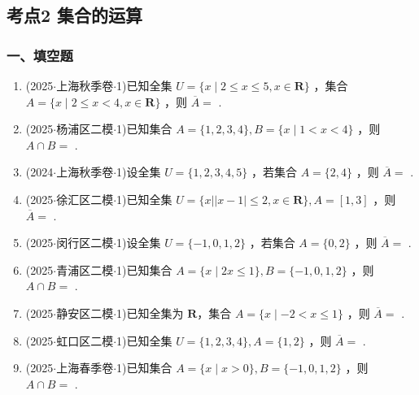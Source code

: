 \subsection*{考点2 集合的运算}

\subsubsection*{一、填空题}
\begin{enumerate}
    \item (2025$\cdot$上海秋季卷$\cdot$1)已知全集 $U = \{ x \mid  2 \leq  x \leq  5,x \in  \mathbf{R}\}$ ，集合 $A = \{ x \mid  2 \leq  x < 4,x \in  \mathbf{R}\}$ ，则 $\overline{A} =$ .

    \item (2025$\cdot$杨浦区二模$\cdot$1)已知集合 $A = \{ 1,2,3,4\} ,B = \{ x \mid  1 < x < 4\}$ ，则 $A \cap  B =$ .

    \item (2024$\cdot$上海秋季卷$\cdot$1)设全集 $U = \{ 1,2,3,4,5\}$ ，若集合 $A = \{ 2,4\}$ ，则 $\overline{A} =$ .

    \item (2025$\cdot$徐汇区二模$\cdot$1)已知全集 $U = \{ x\left| \right| x - 1 \mid   \leq  2,x \in  \mathbf{R}\} ,A = \left\lbrack  {1,3}\right\rbrack$ ，则 $\overline{A} =$ .

    \item (2025$\cdot$闵行区二模$\cdot$1)设全集 $U = \{  - 1,0,1,2\}$ ，若集合 $A = \{ 0,2\}$ ，则 $\overline{A} =$ .

    \item (2025$\cdot$青浦区二模$\cdot$1)已知集合 $A = \{ x \mid  {2x} \leq  1\} ,B = \{  - 1,0,1,2\}$ ，则 $A \cap  B =$ .

    \item (2025$\cdot$静安区二模$\cdot$1)已知全集为 $\mathbf{R}$，集合 $A = \{ x \mid   - 2 < x \leq  1\}$ ，则 $\overline{A} =$ \blkda[3]{$(-\infty-2]\cup(1,+\infty)$}.

    \item (2025$\cdot$虹口区二模$\cdot$1)已知全集 $U = \{ 1,2,3,4\} ,A = \{ 1,2\}$ ，则 $\overline{A} =$ .

    \item (2025$\cdot$上海春季卷$\cdot$1)已知集合 $A = \{ x \mid  x > 0\} ,B = \{  - 1,0,1,2\}$ ，则 $A \cap  B =$ .


\end{enumerate}
